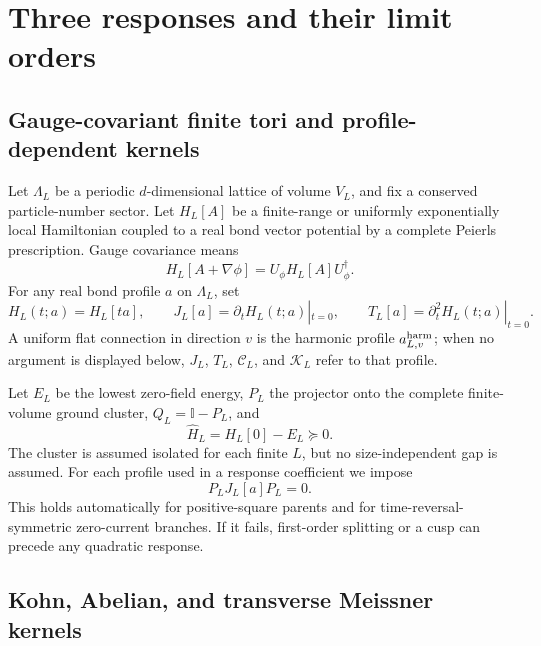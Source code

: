 \documentclass[11pt]{article}
\theoremstyle{definition}
\theoremstyle{remark}
\newcommand{\cK}{\mathcal K}
\newcommand{\cC}{\mathcal C}
\newcommand{\Id}{\mathbb I}
\begin{document}
\section{Three responses and their limit orders}
\label{sec:responses}

\subsection{Gauge-covariant finite tori and profile-dependent kernels}

Let $\Lambda_L$ be a periodic $d$-dimensional lattice of volume $V_L$, and fix a conserved
particle-number sector.  Let $H_L[A]$ be a finite-range or uniformly exponentially local Hamiltonian
coupled to a real bond vector potential by a complete Peierls prescription.  Gauge covariance means
\begin{equation}
 H_L[A+\nabla\phi]=U_\phi H_L[A]U_\phi^\dagger.
 \label{eq:gauge-covariance}
\end{equation}
For any real bond profile $a$ on $\Lambda_L$, set
\begin{equation}
 H_L(t;a)=H_L[ta],
 \qquad
 J_L[a]=\partial_tH_L(t;a)|_{t=0},
 \qquad
 T_L[a]=\partial_t^2H_L(t;a)|_{t=0}.
 \label{eq:JT-profile}
\end{equation}
A uniform flat connection in direction $v$ is the harmonic profile
$a^{\rm harm}_{L,v}$; when no argument is displayed below,
$J_L$, $T_L$, $\cC_L$, and $\cK_L$ refer to that profile.

Let $E_L$ be the lowest zero-field energy, $P_L$ the projector onto the complete finite-volume ground
cluster, $Q_L=\Id-P_L$, and
\begin{equation}
 \widehat H_L=H_L[0]-E_L\succeq0.
 \label{eq:Hhat}
\end{equation}
The cluster is assumed isolated for each finite $L$, but no size-independent gap is assumed.  For each
profile used in a response coefficient we impose
\begin{equation}
 P_LJ_L[a]P_L=0.
 \label{eq:no-linear}
\end{equation}
This holds automatically for positive-square parents and for time-reversal-symmetric zero-current
branches.  If it fails, first-order splitting or a cusp can precede any quadratic response.

\subsection{Kohn, Abelian, and transverse Meissner kernels}
\end{document}
